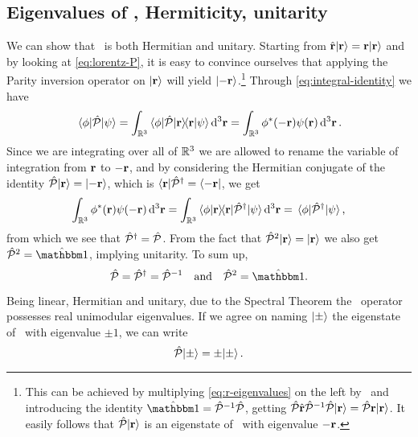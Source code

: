         \subsection{Eigenvalues of \hP, Hermiticity, unitarity}
            We can show that \hP\ is both Hermitian and unitary. Starting from $\hat{\vb{r}}\!\ket{\vb{r}} = \vb{r}\!\ket{\vb{r}}$ and by looking at \eqref{eq:lorentz-P}, it is easy to convince ourselves that applying the Parity inversion operator on $\ket{\vb{r}}$ will yield $\ket{-\vb{r}}$.\footnote{This can be achieved by multiplying \eqref{eq:r-eigenvalues} on the left by \hP\ and introducing the identity $\hidM = \hP^{-1}\hP$, getting $\mathcal{\hat{P}}\hat{\vb{r}}\mathcal{\hat{P}}^{-1}\mathcal{\hat{P}}\!\ket{\vb{r}} = \mathcal{\hat{P}}\vb{r}\!\ket{\vb{r}}$. It easily follows that $\mathcal{\hat{P}}\!\ket{\vb{r}}$ is an eigenstate of \hvr\ with eigenvalue $-\vb{r}$.} Through \eqref{eq:integral-identity} we have
            \begin{equation*}
                \mel{\phi}{\hP}{\psi}
                = \int\nolimits_{\bbR^3}\bra{\phi}\!\hP\!\ket{\vb{r}}\!\!\bra{\vb{r}}\ket{\psi}\dd[3]{\vb{r}}
                = \int\nolimits_{\bbR^3}\phi^*\pqty{-\vb{r}}\psi\pqty{\vb{r}}\dd[3]{\vb{r}}
                \myperiod
            \end{equation*}
            Since we are integrating over all of $\mathbb{R}^3$ we are allowed to rename the variable of integration from $\vb{r}$ to $-\vb{r}$, and by considering the Hermitian conjugate of the identity $\mathcal{\hat{P}}\!\ket{\vb{r}} = \ket{-\vb{r}}$, which is $\bra{\vb{r}}\!\mathcal{\hat{P}}^\dag = \bra{-\vb{r}}$, we get
            \begin{equation*}
                \int\nolimits_{\bbR^3}\phi^*\pqty{\vb{r}}\psi\pqty{-\vb{r}}\dd[3]{\vb{r}}
                = \int\nolimits_{\bbR^3}\bra{\phi}\ket{\vb{r}}\!\!\bra{\vb{r}}\!\hP^\dag\!\ket{\psi}\dd[3]{\vb{r}}
                = \mel{\phi}{\hP^\dag}{\psi}
                \mycomma
            \end{equation*}
            from which we see that $\mathcal{\hat{P}}^\dag = \mathcal{\hat{P}}$. From the fact that $\mathcal{\hat{P}}^2\!\ket{\vb{r}} = \ket{\vb{r}}$ we also get $\hP^2 = \hidM$, implying unitarity. To sum up,
            \begin{equation}
                \label{eq:P-properties}
                \hP
                = \hP^\dag
                = \hP^{-1}
                \qand
                \hP^2
                = \togglehat{\idM}
                \myperiod
            \end{equation}

            Being linear, Hermitian and unitary, due to the Spectral Theorem the \hP\ operator possesses real unimodular eigenvalues. If we agree on naming $\ket{\pm}$ the eigenstate of \hP\ with eigenvalue $\pm 1$, we can write
            \begin{equation}
                \label{eq:eigenvalue-problem-P}
                \mathcal{\hat{P}}\!\ket{\pm}
                = \pm\!\ket{\pm}\text{.}
            \end{equation}
        
